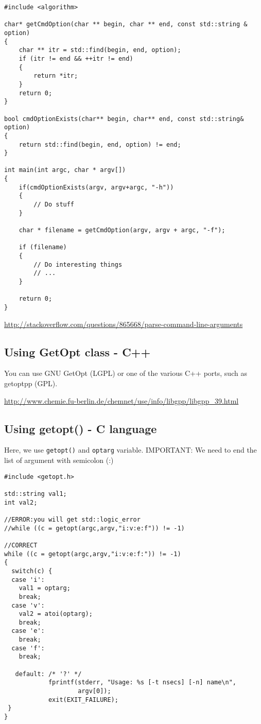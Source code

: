 \begin{lstlisting}
#include <algorithm>

char* getCmdOption(char ** begin, char ** end, const std::string & option)
{
    char ** itr = std::find(begin, end, option);
    if (itr != end && ++itr != end)
    {
        return *itr;
    }
    return 0;
}

bool cmdOptionExists(char** begin, char** end, const std::string& option)
{
    return std::find(begin, end, option) != end;
}

int main(int argc, char * argv[])
{
    if(cmdOptionExists(argv, argv+argc, "-h"))
    {
        // Do stuff
    }

    char * filename = getCmdOption(argv, argv + argc, "-f");

    if (filename)
    {
        // Do interesting things
        // ...
    }

    return 0;
}
\end{lstlisting}
\url{http://stackoverflow.com/questions/865668/parse-command-line-arguments}

\subsection{Using GetOpt class - C++}

You can use GNU GetOpt (LGPL) or one of the various C++ ports, such as getoptpp
(GPL).

\url{http://www.chemie.fu-berlin.de/chemnet/use/info/libgpp/libgpp_39.html}

\subsection{Using getopt() - C language}
\label{sec:getopt()}

Here, we use \verb!getopt()! and \verb!optarg! variable. IMPORTANT: We need to
end the list of argument with semicolon (:)
\begin{verbatim}
#include <getopt.h>

std::string val1;
int val2;

//ERROR:you will get std::logic_error
//while ((c = getopt(argc,argv,"i:v:e:f")) != -1)

//CORRECT
while ((c = getopt(argc,argv,"i:v:e:f:")) != -1)
{
  switch(c) {
  case 'i':
  	val1 = optarg;
	break;
  case 'v':
    val2 = atoi(optarg);
    break;
  case 'e':
  	break;
  case 'f':
    break;
    
   default: /* '?' */
            fprintf(stderr, "Usage: %s [-t nsecs] [-n] name\n",
                    argv[0]);
            exit(EXIT_FAILURE);
 }
}
\end{verbatim}

